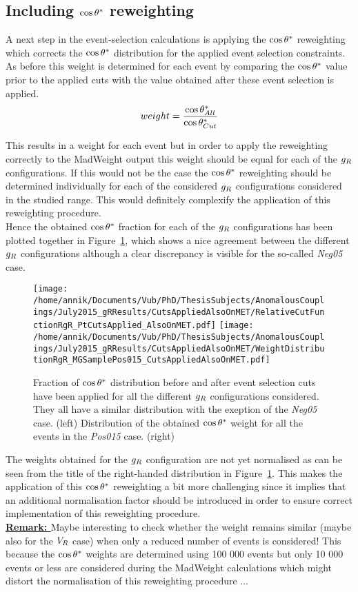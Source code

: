 \subsection{Including $\cos \theta^{*}$ reweighting}
A next step in the event-selection calculations is applying the $\cos \theta^{*}$ reweighting which corrects the $\cos \theta^{*}$ distribution for the applied event selection constraints.
As before this weight is determined for each event by comparing the $\cos \theta^{*}$ value prior to the applied cuts with the value obtained after these event selection is applied.
\begin{equation}
 weight = \frac{\cos \theta^{*}_{All}}{\cos \theta^{*}_{Cut}}
\end{equation}

This results in a weight for each event but in order to apply the reweighting correctly to the MadWeight output this weight should be equal for each of the $g_{R}$ configurations. If this would not be the case the $\cos \theta^{*}$ reweighting should be determined individually for each of the considered $g_{R}$ configurations considered in the studied range. This would definitely complexify the application of this reweighting procedure.\\
Hence the obtained $\cos \theta^{*}$ fraction for each of the $g_{R}$ configurations has been plotted together in Figure~\ref{fig::CosThetagR_FullRange}, which shows a nice agreement between the different $g_{R}$ configurations although a clear discrepancy is visible for the so-called \textit{Neg05} case.
\begin{figure}[h!t]
 \centering
 \texttt{[image: /home/annik/Documents/Vub/PhD/ThesisSubjects/AnomalousCouplings/July2015\_gRResults/CutsAppliedAlsoOnMET/RelativeCutFunctionRgR\_PtCutsApplied\_AlsoOnMET.pdf]}
 \texttt{[image: /home/annik/Documents/Vub/PhD/ThesisSubjects/AnomalousCouplings/July2015\_gRResults/CutsAppliedAlsoOnMET/WeightDistributionRgR\_MGSamplePos015\_CutsAppliedAlsoOnMET.pdf]}
 \caption{Fraction of $\cos \theta^{*}$ distribution before and after event selection cuts have been applied for all the different $g_{R}$ configurations considered. They all have a similar distribution with the exeption of the \textit{Neg05} case. (left) Distribution of the obtained $\cos \theta^{*}$ weight for all the events in the \textit{Pos015} case. (right)} \label{fig::CosThetagR_FullRange}
\end{figure}

The weights obtained for the $g_{R}$ configuration are not yet normalised as can be seen from the title of the right-handed distribution in Figure~\ref{fig::CosThetagR_FullRange}. This makes the application of this $\cos \theta^{*}$ reweighting a bit more challenging since it implies that an additional normalisation factor should be introduced in order to ensure correct implementation of this reweighting procedure.\\
\textbf{\underline{Remark: }} Maybe interesting to check whether the weight remains similar (maybe also for the $V_{R}$ case) when only a reduced number of events is considered! This because the $\cos \theta^{*}$ weights are determined using 100 000 events but only 10 000 events or less are considered during the MadWeight calculations which might distort the normalisation of this reweighting procedure ...

